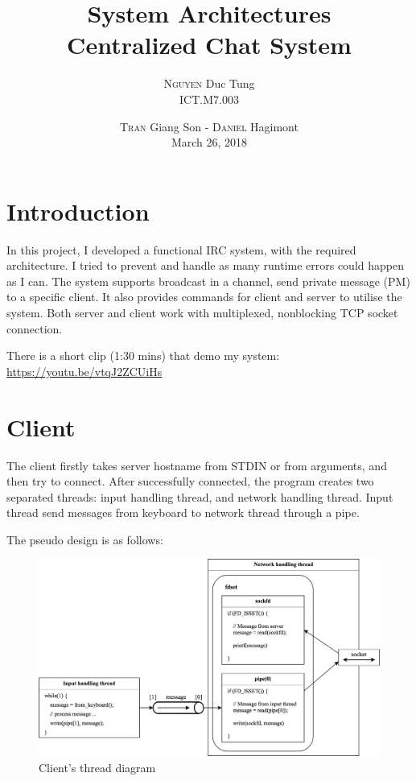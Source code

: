 \documentclass[12pt]{article}
\title{System Architectures \\ \bigskip Centralized Chat System}
\author{\textsc{Nguyen} Duc Tung \\ ICT.M7.003}
\date{\textsc{Tran} Giang Son - \textsc{Daniel} Hagimont \\ \medskip
March 26, 2018}
\begin{document}
\maketitle

\section{Introduction}

In this project, I developed a functional IRC system, with the required architecture. I tried to prevent and handle as many runtime errors could happen as I can. The system supports broadcast in a channel, send private message (PM) to a specific client. It also provides commands for client and server to utilise the system. Both server and client work with multiplexed, nonblocking TCP socket connection.

There is a short clip (1:30 mins) that demo my system: \url{https://youtu.be/vtqJ2ZCUiHs}

\section{Client}

The client firstly takes server hostname from STDIN or from arguments, and then try to connect. After successfully connected, the program creates two separated threads: input handling thread, and network handling thread. Input thread send messages from keyboard to network thread through a pipe.

The pseudo design is as follows:

\begin{figure}[H]
\centering
\includegraphics[width=\textwidth]{client_diagram.png}
\caption{Client's thread diagram}
\end{figure}
\end{document}
